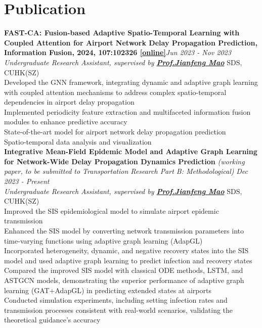 \documentclass[a4paper,8pt]{article}
\begin{document}
\section*{Publication}
\textbf{FAST-CA: Fusion-based Adaptive Spatio-Temporal Learning with Coupled Attention for Airport Network Delay Propagation Prediction, Information Fusion, 2024, 107:102326 \href{https://www.sciencedirect.com/science/article/pii/S1566253524001040}{[online]}}\hfill \textit{Jun 2023 - Nov 2023}\\
\textit{Undergraduate Research Assistant, supervised by \textbf{\href{https://sds.cuhk.edu.cn/en/teacher/268}{Prof.\@ Jianfeng Mao}}} \hfill SDS, CUHK(SZ)\\
\textbullet Developed the GNN framework, integrating dynamic and adaptive graph learning with coupled attention mechanisms to address complex spatio-temporal dependencies in airport delay propagation\\
\textbullet Implemented periodicity feature extraction and multifaceted information fusion modules to enhance predictive accuracy\\
\textbullet State-of-the-art model for airport network delay propagation prediction\\
\textbullet Spatio-temporal data analysis and visualization\\
\textbf{Integrative Mean-Field Epidemic Model and Adaptive Graph Learning for Network-Wide Delay Propagation Dynamics Prediction} \textit{\small (working paper, to be submitted to Transportation Research Part B: Methodological)} \hfill \textit{Dec 2023 - Present}\\
\textit{Undergraduate Research Assistant, supervised by \textbf{\href{https://sds.cuhk.edu.cn/en/teacher/268}{Prof.\@ Jianfeng Mao}}} \hfill SDS, CUHK(SZ)\\
\textbullet Improved the SIS epidemiological model to simulate airport epidemic transmission\\
\textbullet Enhanced the SIS model by converting network transmission parameters into time-varying functions using adaptive graph learning (AdapGL)\\
\textbullet Incorporated heterogeneity, dynamic, and negative recovery states into the SIS model and used adaptive graph learning to predict infection and recovery states\\
\textbullet Compared the improved SIS model with classical ODE methods, LSTM, and ASTGCN models, demonstrating the superior performance of adaptive graph learning (GAT+AdapGL) in predicting extended states at airports\\
\textbullet Conducted simulation experiments, including setting infection rates and transmission processes consistent with real-world scenarios, validating the theoretical guidance's accuracy
\end{document}
